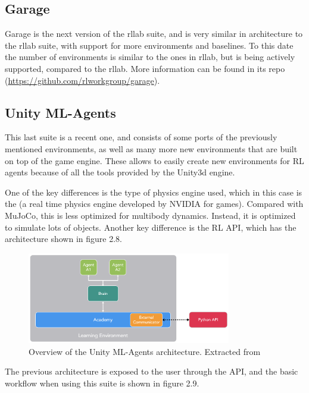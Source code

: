    \subsection{Garage}
    Garage is the next version of the rllab suite, and is very similar in architecture to the rllab suite, with support
    for more environments and baselines. To this date the number of environments is similar to the ones in rllab, but is
    being actively supported, compared to the rllab. More information can be found in its repo (\url{https://github.com/rlworkgroup/garage}).
 
    \subsection{Unity ML-Agents}
    This last suite \citep{unity-ml-agents} is a recent one, and consists of some ports of the previously mentioned environments, as well
    as many more new environments that are built on top of the \citeauthor{unity} game engine. These allows to easily create new environments
    for RL agents because of all the tools provided by the Unity3d engine.

    One of the key differences is the type of physics engine used, which in this case is the \citeauthor{physX} (a real time physics engine
    developed by NVIDIA for games). Compared with MuJoCo, this is less optimized for multibody dynamics. Instead, it is optimized to simulate
    lots of objects. Another key difference is the RL API, which has the architecture shown in figure 2.8.

    \begin{figure}[!ht]
        \centering
        \includegraphics[width=3.5in]{./chapters/imgs/img_unity_mlagents_api_overview.png}
        \caption[unity ml agents overview]{Overview of the Unity ML-Agents architecture. Extracted from \citet{unity-ml-agents}}
        \label{fig:unity-ml-agents-overview}
    \end{figure}

    The previous architecture is exposed to the user through the API, and the basic workflow when using
    this suite is shown in figure 2.9.

